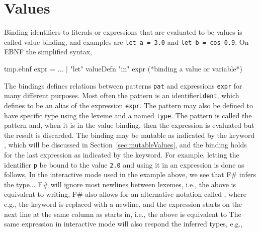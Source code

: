 \section{Values}
Binding identifiers to literals or expressions that are evaluated to be values is called value binding, and examples are \lstinline!let a = 3.0! and \lstinline!let b = cos 0.9!. On EBNF the simplified syntax,
%
\begin{verbatimwrite}{tmp.ebnf}
expr = ...
  | "let" valueDefn "in" expr (*binding a value or variable*)
\end{verbatimwrite}
%
The  bindings defines relations between patterns \lstinline[language=ebnf]!pat! and expressions \lstinline[language=ebnf]!expr! for many different purposes. Most often the pattern is an identifier\lstinline[language=ebnf]!ident!, which  defines to be an alias of the expression \lstinline[language=ebnf]!expr!. The pattern may also be defined to have specific type using the \idx{\lexeme{:}} lexeme and a named \lstinline[language=ebnf]!type!. The \lexeme{\_} pattern is called the  pattern and, when it is in the value binding, then the expression is evaluated but the result is discarded. The binding may be mutable as indicated by the keyword , which will be discussed in Section~\ref{sec:mutableValues}, and the binding holds  for the last expression as indicated by the  keyword. For example, letting the identifier \lstinline!p! be bound to the value \lstinline!2.0! and using it in an expression is done as follows,
%
%
In the interactive mode used in the example above, we see that F\# infers the type...
F\# will ignore most newlines between lexemes, i.e., the above is equivalent to writing,
%
%
F\# also allows for an alternative notation called , where e.g., the  keyword is replaced with a newline, and the expression starts on the next line at the same column as  starts in, i.e., the above is equivalent to
%
%
The same expression in interactive mode will also respond the inferred types, e.g.,
%
%
